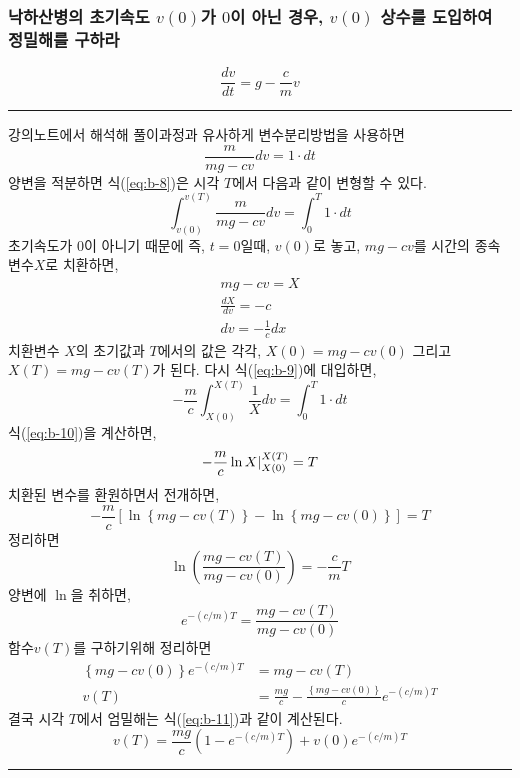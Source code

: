 \subsubsection{낙하산병의 초기속도 $v(0)$가 $0$이 아닌 경우, $v(0)$ 상수를 도입하여 정밀해를 구하라}
\begin{equation}
\frac{dv}{dt}=g-\frac{c}{m}v
\label{eq:b-7}
\end{equation}
\rule{\textwidth}{0.1pt}
 강의노트에서 해석해 풀이과정과 유사하게 변수분리방법을 사용하면
\begin{equation}
\frac{m}{mg-cv}dv=1\cdot dt
\label{eq:b-8}
\end{equation}
양변을 적분하면 식(\ref{eq:b-8})은 시각 $T$에서 다음과 같이 변형할 수 있다.
\begin{equation}
\int_{v(0)}^{v(T)}\frac{m}{mg-cv}dv=\int_{0}^{T}1\cdot dt
\label{eq:b-9}
\end{equation}
초기속도가 $0$이 아니기 때문에 즉, $t=0$일때, $v(0)$로 놓고, $mg-cv$를 시간의 종속변수$X$로 치환하면,
\begin{eqnarray}
mg-cv=X\\
\frac{dX}{dv}=-c\\
dv=-\frac{1}{c}dx
\end{eqnarray}
치환변수 $X$의 초기값과 $T$에서의 값은 각각, $X(0)=mg-cv(0)$ 그리고 $X(T)=mg-cv(T)$가 된다. 다시 식(\ref{eq:b-9})에 대입하면,
\begin{equation}
-\frac{m}{c}\int_{X(0)}^{X(T)}\frac{1}{X}dv=\int_{0}^{T}1\cdot dt
\label{eq:b-10}
\end{equation}
식(\ref{eq:b-10})을 계산하면,
\begin{equation}
-\frac{m}{c}\ln X\arrowvert_{X(0)}^{X(T)}=T
\end{equation}
치환된 변수를 환원하면서 전개하면,
\begin{equation}
-\frac{m}{c}\left[\ln\left\{mg-cv(T)\right\}-\ln\left\{mg-cv(0)\right\}\right] = T
\end{equation}
정리하면
\begin{equation}
\ln\left(\frac{mg-cv(T)}{mg-cv(0)}\right) = -\frac{c}{m}T
\end{equation}
양변에 $\ln$을 취하면,
\begin{equation}
e^{-(c/m)T}=\frac{mg-cv(T)}{mg-cv(0)}
\end{equation}
함수$v(T)$를 구하기위해 정리하면
\begin{align}
\left\{mg-cv(0)\right\}e^{-(c/m)T}&=mg-cv(T)\\
v(T)&=\frac{mg}{c}-\frac{\left\{mg-cv(0)\right\}}{c}e^{-(c/m)T}
\end{align}
결국 시각 $T$에서 엄밀해는 식(\ref{eq:b-11})과 같이 계산된다.
\begin{equation}
v(T)=\frac{mg}{c}\left(1-e^{-(c/m)T}\right)+v(0)e^{-(c/m)T}
\label{eq:b-11}
\end{equation}
\rule{\textwidth}{0.1pt}
